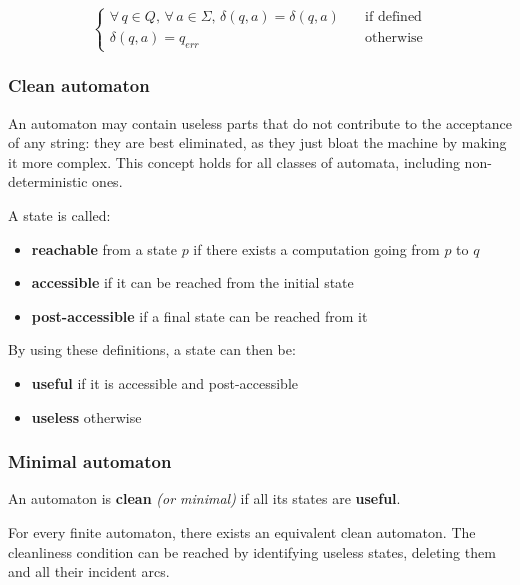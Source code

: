 \documentclass[english]{article}
\begin{document}
\[\begin{cases}
    \forall \, q \in Q, \, \forall \, a \in \Sigma, \, \delta(q, a) = \delta(q, a) \quad & \text{if defined} \\
    \delta(q, a)= q_\textit{err} \quad                                                   & \text{otherwise}
  \end{cases}\]

\subsubsection{Clean automaton}
\label{sec:clean-automaton}

An automaton may contain useless parts that do not contribute to the acceptance of any string: they are best eliminated, as they just bloat the machine by making it more complex.
This concept holds for all classes of automata, including non-deterministic ones.

A state is called:
\begin{itemize}
  \item \textbf{reachable} from a state \(p\) if there exists a computation going from \(p\) to \(q\)
  \item \textbf{accessible} if it can be reached from the initial state
  \item \textbf{post-accessible} if a final state can be reached from it
\end{itemize}

By using these definitions, a state can then be:
\begin{itemize}
  \item \textbf{useful} if it is accessible and post-accessible
  \item \textbf{useless} otherwise
\end{itemize}

\subsubsection{Minimal automaton}
An automaton is \textbf{clean} \textit{(or minimal)} if all its states are \textbf{useful}.

\begin{property}
  \label{prop:minimal-automaton}
  For every finite automaton, there exists an equivalent clean automaton.
  The cleanliness condition can be reached by identifying useless states, deleting them and all their incident arcs.
\end{property}
\end{document}
